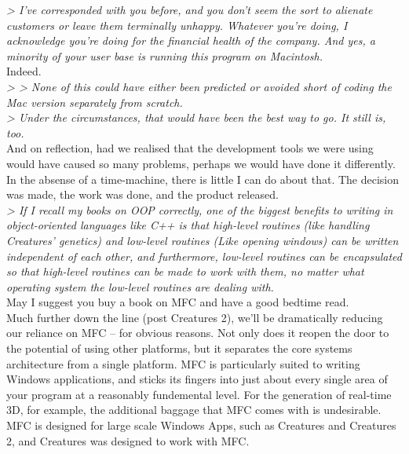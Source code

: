\documentclass[11pt,twoside,a4paper]{article}
\begin{document}
\begin{multicols*}{2}
\emph{> I've corresponded with you before, and you don't seem the sort to alienate customers or leave them terminally unhappy. Whatever you're doing, I acknowledge you're doing for the financial health of the company. And yes, a minority of your user base is running this program on Macintosh.}~\\

Indeed.~\\

\emph{> >  None of this could have either been predicted or avoided short of coding the Mac version separately from scratch.}~\\
\emph{> Under the circumstances, that would have been the best way to go. It still is, too.}~\\

And on reflection, had we realised that the development tools we were using would have caused so many problems, perhaps we would have done it differently. In the absense of a time-machine, there is little I can do about that. The decision was made, the work was done, and the product released.~\\

\emph{> If I recall my books on OOP correctly, one of the biggest benefits to writing in object-oriented languages like C++ is that high-level routines (like handling Creatures' genetics) and low-level routines (Like opening windows) can be written independent of each other, and furthermore, low-level routines can be encapsulated so that high-level routines can be made to work with them, no matter what operating system the low-level routines are dealing with.}~\\

May I suggest you buy a book on MFC and have a good bedtime read.~\\

Much further down the line (post Creatures 2), we'll be dramatically reducing our reliance on MFC -- for obvious reasons. Not only does it reopen the door to the potential of using other platforms, but it separates the core systems architecture from a single platform. MFC is particularly suited to writing Windows applications, and sticks its fingers into just about every single area of your program at a reasonably fundemental level. For the generation of real-time 3D, for example, the additional baggage that MFC comes with is undesirable. MFC is designed for large scale Windows Apps, such as Creatures and Creatures 2, and Creatures was designed to work with MFC.~\\


\end{multicols*}
\end{document}
